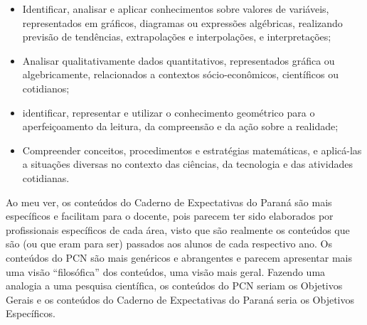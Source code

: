 \documentclass[a4paper, 12pt]{article}
\begin{document}
\begin{enumerate}
\begin{itemize}
  \item  Identificar, analisar e aplicar conhecimentos sobre valores de variáveis, representados em gráficos, diagramas ou expressões algébricas, realizando previsão de tendências, extrapolações e interpolações, e interpretações;
  \item Analisar qualitativamente dados quantitativos, representados gráfica ou algebricamente, relacionados a contextos sócio-econômicos, científicos ou cotidianos;
  \item  identificar, representar e utilizar o conhecimento geométrico para o aperfeiçoamento da leitura, da compreensão e da ação sobre a realidade;
  \item Compreender conceitos, procedimentos e estratégias matemáticas, e aplicá-las a situações 
diversas no contexto das ciências, da tecnologia e das atividades cotidianas. 
  \end{itemize}  
  Ao meu ver, os conteúdos do Caderno de Expectativas do Paraná são mais específicos e facilitam para o docente, pois parecem ter sido elaborados por profissionais específicos de cada área, visto que são realmente os conteúdos que são (ou que eram para ser) passados aos alunos de cada respectivo ano. Os conteúdos do PCN são mais genéricos e abrangentes e parecem apresentar mais uma visão ``filosófica'' dos conteúdos, uma visão mais geral. Fazendo uma analogia a uma pesquisa científica, os conteúdos do PCN seriam os Objetivos Gerais e os conteúdos do Caderno de Expectativas do Paraná seria os Objetivos Específicos.
  
\end{enumerate}
\end{document}
